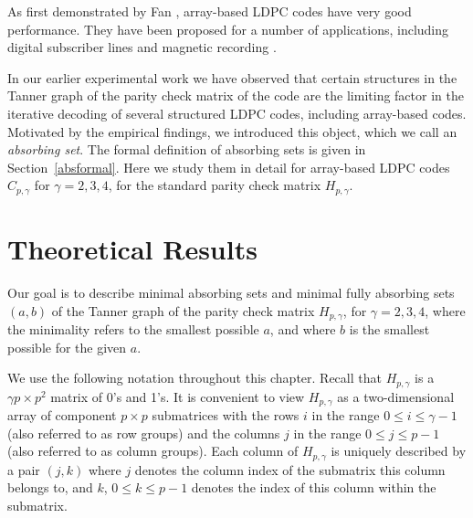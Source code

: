 As first demonstrated by Fan \cite{fan}, array-based LDPC codes
have very good performance. They have been proposed for a number
of applications, including digital subscriber lines \cite{ibm:02}
and magnetic recording  \cite{vasic:05}.




In our earlier experimental work \cite{zhang06} we have observed
that certain structures in the Tanner graph of the parity check
matrix of the code are the limiting factor in the iterative decoding
of several structured LDPC codes, including array-based codes.
Motivated by the empirical findings, we introduced this object,
which we call an \emph{absorbing set}. The formal definition of
absorbing sets is given in Section~\ref{absformal}. Here we study
them in detail for array-based LDPC codes $C_{p,\gamma}$ for
$\gamma=2,3,4$, for the standard parity check matrix $H_{p,\gamma}$.



\section{Theoretical Results}\label{theo1}

Our goal is to describe minimal absorbing sets and minimal fully
absorbing sets $(a,b)$ of the Tanner graph of the parity check
matrix $H_{p,\gamma}$, for $\gamma =2,3,4$, where the minimality
refers to the smallest possible $a$, and where $b$ is the smallest
possible for the given $a$.

We use the following notation throughout this chapter. Recall that
$H_{p,\gamma}$ is a $\gamma p \times p^2$ matrix of 0's and 1's. It
is convenient to view $H_{p,\gamma}$ as a two-dimensional array of
component $p \times p$ submatrices with the rows $i$ in the range $0
\leq i \leq \gamma-1$ (also referred to as row groups) and the
columns $j$ in the range $0 \leq j \leq p-1$ (also referred to as
column groups). Each column of $H_{p,\gamma}$ is uniquely described
by a pair $(j,k)$ where $j$ denotes the column index of the
submatrix this column belongs to, and $k$, $0 \leq k \leq p-1$
denotes the index of this column within the submatrix.

